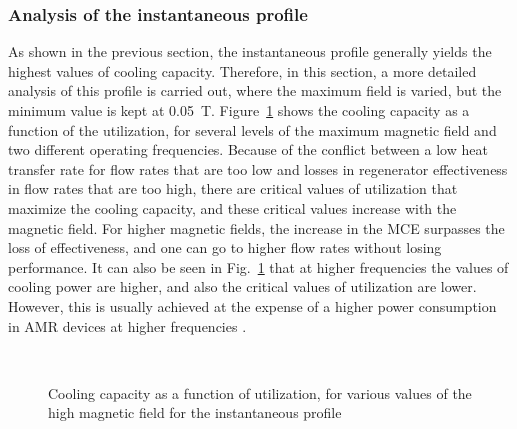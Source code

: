 \documentclass[referee]{svjour3}
\begin{document}
\subsubsection{Analysis of the instantaneous profile}
\label{sec:deta-analys-inst}

As shown in the previous section, the instantaneous profile generally yields the highest values of cooling capacity. Therefore, in this section, a more detailed analysis of this profile is carried out, where the maximum field is varied, but the minimum value is kept at \SI{0.05}{\tesla}. Figure~\ref{fig:qc_phi_inst} shows the cooling capacity as a function of the utilization, for several levels of the maximum magnetic field and two different operating frequencies. Because of the conflict between a low heat transfer rate for flow rates that are too low and losses in regenerator effectiveness in flow rates that are too high, there are critical values of utilization that maximize the cooling capacity, and these critical values increase with the magnetic field. For higher magnetic fields, the increase in the MCE surpasses the loss of effectiveness, and one can go to higher flow rates without losing performance. It can also be seen in Fig.~\ref{fig:qc_phi_inst} that at  higher frequencies the values of cooling power are higher, and also the critical values of utilization are lower. However, this is usually achieved at the expense of a higher power consumption in AMR devices at higher frequencies \cite{bib:lei15_study,NIKNIA2016601}.

\begin{figure}[!ht]
  \centering
{}
\,
  \caption{Cooling capacity as a function of utilization, for various values of the high magnetic field  for the instantaneous profile}
  \label{fig:qc_phi_inst}
\end{figure}
\end{document}

